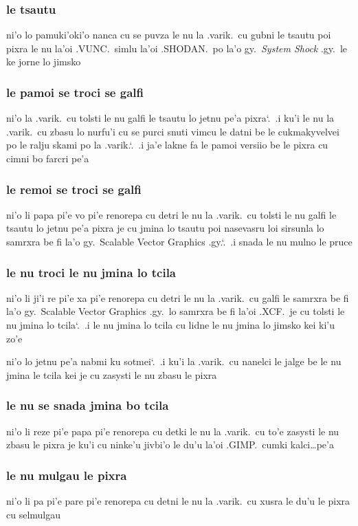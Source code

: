 \documentclass{report}
\newcommand\sds{\spacefactor\sfcode`.\ \space}
\begin{document}
\subsubsection{le tsautu}
ni'o lo pamuki'oki'o nanca cu se puvza le nu la .varik.\ cu gubni le tsautu poi pixra le nu la'oi .VUNC.\ simlu la'oi .SHODAN.\ po la'o gy.\ \textit{System Shock} .gy.\ le ke jorne lo jimsko

\subsubsection{le pamoi se troci se galfi}
ni'o la .varik.\ cu tolsti le nu galfi le tsautu lo jetnu pe'a pixra\sds  .i ku'i le nu la .varik.\ cu zbasu lo nurfu'i cu se purci snuti vimcu le datni be le cukmakyvelvei po le ralju skami po la .varik.\sds  .i ja'e lakne fa le pamoi versiio be le pixra cu cimni bo farcri pe'a

\subsubsection{le remoi se troci se galfi}
ni'o li papa pi'e vo pi'e renorepa cu detri le nu la .varik.\ cu tolsti le nu galfi le tsautu lo jetnu pe'a pixra je cu jmina lo tsautu poi nasevasru loi sirsunla lo samrxra be fi la'o gy.\ Scalable Vector Graphics .gy.\sds  .i snada le nu mulno le pruce

\subsubsection{le nu troci le nu jmina lo tcila}
ni'o li ji'i re pi'e xa pi'e renorepa cu detri le nu la .varik.\ cu galfi le samrxra be fi la'o gy.\ Scalable Vector Graphics .gy.\ lo samrxra be fi la'oi .XCF.\ je cu tolsti le nu jmina lo tcila\sds  .i le nu jmina lo tcila cu lidne le nu jmina lo jimsko kei ki'u zo'e

ni'o lo jetnu pe'a nabmi ku sotmei\sds  .i ku'i la .varik.\ cu nanelci le jalge be le nu jmina le tcila kei je cu zasysti le nu zbasu le pixra

\subsubsection{le nu se snada jmina bo tcila}
ni'o li reze pi'e papa pi'e renorepa cu detki le nu la .varik.\ cu to'e zasysti le nu zbasu le pixra je ku'i cu ninke'u jivbi'o le du'u la'oi .GIMP.\ cumki kalci\ldots pe'a

\subsubsection{le nu mulgau le pixra}
ni'o li pa pi'e pare pi'e renorepa cu detni le nu la .varik.\ cu xusra le du'u le pixra cu selmulgau
\end{document}
